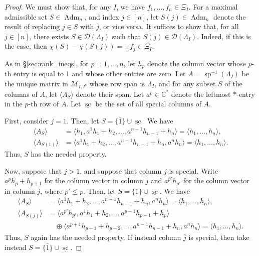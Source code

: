 \documentclass[12pt]{amsart}
\DeclareMathOperator{\Adm}{Adm}
\DeclareMathOperator{\ssp}{sp}
\DeclareMathOperator{\SC}{sc}
\newcommand{\bC}{\mathbb{C}}
\newcommand{\cD}{\mathcal{D}}
\newcommand{\cM}{\mathcal{M}}
\newcommand{\barj}{\overline{j}}
\begin{document}
\begin{proof}
    We must show that, for any $I$, we have $f_1,\ldots,f_n\in \Xi_I$. For a maximal admissible set $S\in\Adm_n$, and index $j\in[n]$, let $S(j)\in\Adm_n$ denote the result of replacing $j\in S$ with $\barj$, or vice versa. It suffices to show that, for all $j\in[n]$, there exists $S\in\cD(\Lambda_I)$ such that $S(j)\in\cD(\Lambda_I)$. Indeed, if this is the case, then $\chi(S)-\chi(S(j))=\pm f_j\in \Xi_I$. 
    
    As in \S\ref{sec:rank_ineqs}, for $p=1,\ldots,n$, let $h_p$ denote the column vector whose $p$-th entry is equal to 1 and whose other entries are zero. Let $A=\ssp^{-1}(\Lambda_I)$ be the unique matrix in $\cM_{I,I^c}$ whose row span is $\Lambda_I$, and for any subset $S$ of the columns of $A$, let $\langle A_S\rangle$ denote their span. Let $a^p\in \bC^{*}$ denote the leftmost $*$-entry in the $p$-th row of $A$. Let $\underline{\SC}$ be the set of all special columns of $A$.
    
    First, consider $j=1$. Then, let $S=\{\bar1\}\cup \underline{\SC}$. We have
    \begin{align*}
        \langle A_S\rangle &=\langle h_1,a^1h_1+h_2,\ldots,a^{n-1}h_{n-1}+h_n\rangle=\langle h_1,\ldots,h_n\rangle,\\
        \langle A_{S(1)}\rangle &=\langle a^1h_1+h_2,\ldots,a^{n-1}h_{n-1}+h_n,a^nh_n\rangle=\langle h_1,\ldots,h_n\rangle.
    \end{align*}
    Thus, $S$ has the needed property.

    Now, suppose that $j>1$, and suppose that column $j$ is special. Write $a^ph_p+h_{p+1}$ for the column vector in column $j$ and $a^{p'}h_{p'}$ for the column vector in column $\barj$, where $p'\le p$. Then, let $S=\{1\}\cup\underline{\SC}$. We have
    \begin{align*}
        \langle A_S\rangle &=\langle a^1h_1+h_2,\ldots,a^{n-1}h_{n-1}+h_n,a^nh_n\rangle=\langle h_1,\ldots,h_n\rangle,\\
        \langle A_{S(j)}\rangle &=\langle a^{p'}h_{p'}, a^1h_1+h_2,\ldots,a^{p-1}h_{p-1}+h_p\rangle\\
        &\quad \oplus 
        \langle a^{p+1}h_{p+1}+h_{p+2},\ldots,a^{n-1}h_{n-1}+h_n,a^nh_n\rangle=\langle h_1,\ldots,h_n\rangle.
    \end{align*}
    Thus, $S$ again has the needed property. If instead column $\barj$ is special, then take instead $S=\{\bar1\}\cup \underline{\SC}$.
    \end{proof}
\end{document}
